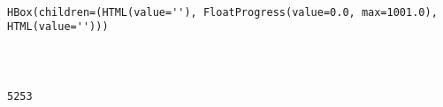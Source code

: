 \documentclass[11pt]{article}
\begin{document}
    \begin{center}
    \end{center}
    { \hspace*{\fill} \\}
    
    
    \begin{Verbatim}[commandchars=\\\{\}]
HBox(children=(HTML(value=''), FloatProgress(value=0.0, max=1001.0), HTML(value='')))
    \end{Verbatim}

    
    \begin{Verbatim}[commandchars=\\\{\}]

    \end{Verbatim}

    \begin{center}
    \end{center}
    { \hspace*{\fill} \\}
    
    \begin{Verbatim}[commandchars=\\\{\}]
5253
    \end{Verbatim}

    \begin{center}
    \end{center}
    { \hspace*{\fill} \\}
    
    \begin{center}
    \end{center}
    { \hspace*{\fill} \\}
    
\end{document}
